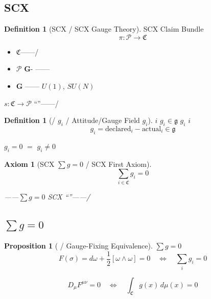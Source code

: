 \documentclass[12pt,a4paper]{article}
\theoremstyle{plain}
\newtheorem{proposition}[theorem]{ Proposition}
\newtheorem{axiom}[theorem]{ Axiom}
\theoremstyle{definition}
\newtheorem{definition}[theorem]{ Definition}
\newcommand{\Pcal}{\mathcal{P}}
\newcommand{\Lie}{\mathfrak{g}}
\newcommand{\curv}{F}
\newcommand{\conn}{\omega}
\newcommand{\sect}{\sigma}
\newcommand{\GaugeGroup}{\mathbf{G}}
\newcommand{\ClaimSpace}{\mathfrak{C}}
\begin{document}
\subsection{SCX }

\begin{definition}[SCX  / SCX Gauge Theory]
SCX \textbf{}Claim Bundle
\begin{equation}
    \pi: \Pcal \to \ClaimSpace
\end{equation}

\begin{itemize}
    \item $\ClaimSpace$——/
    \item $\Pcal$ $\GaugeGroup$- —— 
    \item $\GaugeGroup$ ——  $U(1)$, $SU(N)$
\end{itemize}

\textbf{} $s: \ClaimSpace \to \Pcal$
``''——\textbf{}/
\end{definition}

\begin{definition}[/ $g_i$ / Attitude/Gauge Field $g_i$]
 $i$  $g_i \in \Lie$
$g_i$  $i$ \textbf{}
\begin{equation}
    g_i = \text{declared}_i - \text{actual}_i \in \Lie
\end{equation}

$g_i = 0$  $=$ $g_i \neq 0$ 
\end{definition}

\begin{axiom}[SCX $\sum g = 0$ / SCX First Axiom]

\begin{equation}
    \boxed{\sum_{i \in \ClaimSpace} g_i = 0}
\end{equation}

\textbf{}——$\sum g = 0$ 
SCX ``''——/
\end{axiom}

\subsection{ $\sum g = 0$}

\begin{proposition}[ / Gauge-Fixing Equivalence]
$\sum g = 0$ \textbf{}
\begin{equation}
    \curv(\sect) = d\conn + \frac{1}{2}[\conn \wedge \conn] = 0
    \quad \Longleftrightarrow \quad
    \sum_{i} g_i = 0
\end{equation}


\begin{equation}
    D_\mu F^{\mu\nu} = 0 \quad \Longleftrightarrow \quad \int_{\ClaimSpace} g(x)\, d\mu(x) = 0
\end{equation}
\end{proposition}
\end{document}
